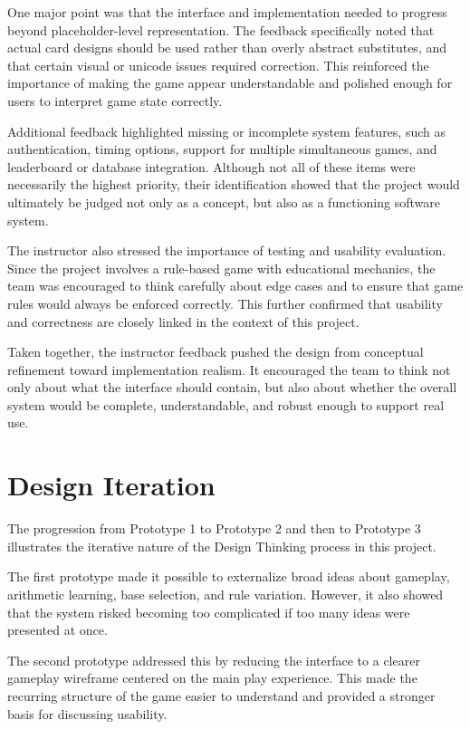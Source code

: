 \documentclass[12pt]{article}
\begin{document}
    One major point was that the interface and implementation needed to progress beyond placeholder-level representation. The feedback specifically noted that actual card designs should be used rather than overly abstract substitutes, and that certain visual or unicode issues required correction. This reinforced the importance of making the game appear understandable and polished enough for users to interpret game state correctly.

    Additional feedback highlighted missing or incomplete system features, such as authentication, timing options, support for multiple simultaneous games, and leaderboard or database integration. Although not all of these items were necessarily the highest priority, their identification showed that the project would ultimately be judged not only as a concept, but also as a functioning software system.

    The instructor also stressed the importance of testing and usability evaluation. Since the project involves a rule-based game with educational mechanics, the team was encouraged to think carefully about edge cases and to ensure that game rules would always be enforced correctly. This further confirmed that usability and correctness are closely linked in the context of this project.

    Taken together, the instructor feedback pushed the design from conceptual refinement toward implementation realism. It encouraged the team to think not only about what the interface should contain, but also about whether the overall system would be complete, understandable, and robust enough to support real use.

    \section{Design Iteration}

    The progression from Prototype 1 to Prototype 2 and then to Prototype 3 illustrates the iterative nature of the Design Thinking process in this project.

    The first prototype made it possible to externalize broad ideas about gameplay, arithmetic learning, base selection, and rule variation. However, it also showed that the system risked becoming too complicated if too many ideas were presented at once.

    The second prototype addressed this by reducing the interface to a clearer gameplay wireframe centered on the main play experience. This made the recurring structure of the game easier to understand and provided a stronger basis for discussing usability.
\end{document}
